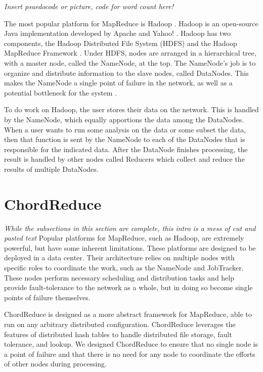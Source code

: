 \textit{Insert psuedocode or picture, code for word count here!}


The most popular platform for MapReduce is Hadoop \cite{Hadoop}. Hadoop is an open-source Java implementation developed by Apache and Yahoo! \cite{pavlo2009comparison}.  Hadoop has two components, the Hadoop Distributed File System (HDFS) \cite{hdfs} and the Hadoop MapReduce Framework \cite{mrsurvey}.  Under HDFS, nodes are arranged in a hierarchical tree, with a master node, called the NameNode, at the top.  The NameNode's job is to organize and distribute information to the slave nodes, called DataNodes.  This makes the NameNode a single point of failure \cite{shvachko2010hadoop} in the network, as well as a potential bottleneck for the system \cite{hadoop-bottle}.

To do work on Hadoop, the user stores their data on the network.  This is handled by the NameNode, which equally apportions the data among the DataNodes.  When a user wants to run some analysis on the data or some subset the data, then that function is sent by the NameNode to each of the DataNodes that is responsible for the indicated data.   After the DataNode finishes processing, the result is handled by other nodes called Reducers which collect and reduce the results of multiple DataNodes.


\section{ChordReduce}
\textit{While the subsections in this section are complete, this intro is a mess of cut and pasted text}
Popular platforms for MapReduce, such as Hadoop, are extremely powerful, but have some inherent limitations.  
These platforms are designed to be deployed in a data center.  
Their architecture relies on multiple nodes with specific roles to coordinate the work, such as the NameNode and JobTracker.
These nodes perform necessary scheduling and distribution tasks and help provide fault-tolerance to the network as a whole, but in doing so become single points of failure themselves.

ChordReduce is designed as a more abstract framework for MapReduce, able to run on any arbitrary distributed configuration.
ChordReduce leverages the features of distributed hash tables to handle distributed file storage, fault tolerance, and lookup.  We designed ChordReduce to ensure that no single node is a point of failure and that there is no need for any node to coordinate the efforts of other nodes during processing.  

